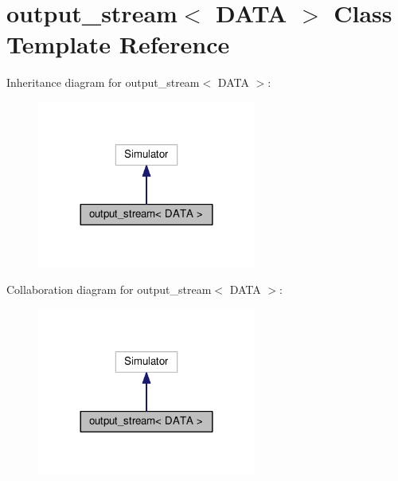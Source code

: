 \hypertarget{classoutput__stream}{}\section{output\+\_\+stream$<$ D\+A\+TA $>$ Class Template Reference}
\label{classoutput__stream}


Inheritance diagram for output\+\_\+stream$<$ D\+A\+TA $>$\+:\nopagebreak
\begin{figure}[H]
\begin{center}
\leavevmode
\includegraphics[width=204pt]{classoutput__stream__inherit__graph}
\end{center}
\end{figure}


Collaboration diagram for output\+\_\+stream$<$ D\+A\+TA $>$\+:\nopagebreak
\begin{figure}[H]
\begin{center}
\leavevmode
\includegraphics[width=204pt]{classoutput__stream__coll__graph}
\end{center}
\end{figure}
